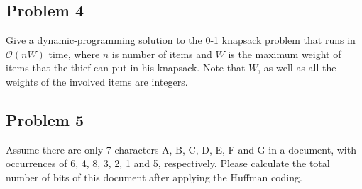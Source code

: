 \documentclass[a4paper]{article}
\makeatletter
\newenvironment{solution}
  {\begin{proof}[Solution]}
  {\end{proof}}
\renewenvironment{proof}[1][\proofname]{%
  \par\pushQED{\qed}\normalfont%
  \topsep6\p@\@plus6\p@\relax
  \trivlist\item[\hskip\labelsep\bfseries#1\@addpunct{.}]%
  \ignorespaces
}{%
  \popQED\endtrivlist\@endpefalse
}
\makeatother
\begin{document}
\begin{solution}
\end{solution}

\subsection*{Problem 4}
Give a dynamic-programming solution to the 0-1 knapsack problem that runs in $\mathcal{O}(nW)$ time, where $n$ is number of items and $W$ is the maximum weight of items that the thief can put in his knapsack. Note that $W$, as well as all the weights of the involved items are integers.
\begin{solution}
\end{solution}

\subsection*{Problem 5}
Assume there are only 7 characters A, B, C, D, E, F and G in a document, with occurrences of 6, 4, 8, 3, 2, 1 and 5, respectively. Please calculate the total number of bits of this document after applying the Huffman coding.
\end{document}
